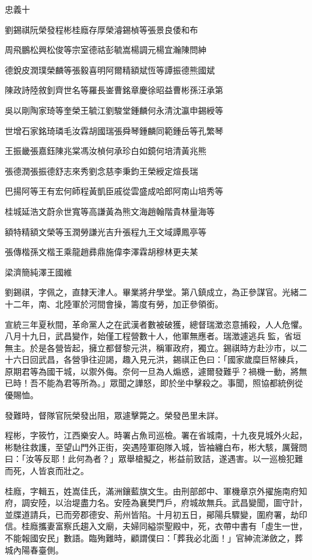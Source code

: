 
\begin{pinyinscope}
忠義十

劉錫祺阮榮發程彬桂廕存厚榮濬錫楨等張景良倭和布

周飛鵬松興松俊等宗室德祜彭毓嵩楊調元楊宜瀚陳問紳

德銳皮潤璞榮麟等張毅喜明阿爾精額斌恆等譚振德熊國斌

陳政詩陸敘釗齊世名等羅長崟曹銘章慶徐昭益曹彬孫汪承第

吳以剛陶家琦等奎榮王毓江劉駿堂鍾麟何永清沈瀛申錫綬等

世增石家銘琦璘毛汝霖胡國瑞張舜琴鍾麟同範鍾岳等孔繁琴

王振畿張嘉鈺陳兆棠馮汝楨何承珍白如鏡何培清黃兆熊

張德潤張振德舒志來秀劉念慈李秉鈞王榮綬定煊長瑞

巴揚阿等王有宏何師程黃凱臣戚從雲盛成哈郎阿南山培秀等

桂城延浩文蔚佘世寬等高謙黃為熊文海趙翰階貴林量海等

額特精額文榮等玉潤勞謙光吉升張程九王文域譚鳳亭等

張傳楷孫文楷王乘龍趙彞鼎施偉李澤霖胡穆林更夫某

梁濟簡純澤王國維

劉錫祺，字佩之，直隸天津人。畢業將弁學堂。第八鎮成立，為正參謀官。光緒二十二年，南、北陸軍於河間會操，籌度有勞，加正參領銜。

宣統三年夏秋間，革命黨人之在武漢者數被破獲，總督瑞澂恣意捕殺，人人危懼。八月十九日，武昌變作，始僅工程營數十人，他軍無應者。瑞澂遽逃兵監，省垣無主。於是各營皆起，擁立都督黎元洪，稱軍政府，獨立。錫祺時方赴沙市，以二十六日回武昌，各營爭往迎謁，趣入見元洪，錫祺正色曰：「國家歲糜巨帑練兵，原期君等為國干城，以禦外侮。奈何一旦為人煽惑，遽爾發難乎？禍機一動，將無已時！吾不能為君等所為。」眾聞之譁怒，即於坐中擊殺之。事聞，照協都統例從優賜恤。

發難時，督隊官阮榮發出阻，眾遽擊斃之。榮發邑里未詳。

程彬，字筱竹，江西樂安人。時署占魚司巡檢。署在省城南，十九夜見城外火起，彬馳往救護，至望山門外正街，突遇陸軍砲隊入城，皆袖纏白布，彬大駭，厲聲問曰：「汝等反耶！此何為者？」眾舉槍擬之，彬益前致詰，遂遇害。以一巡檢犯難而死，人皆哀而壯之。

桂廕，字輯五，姓嵩佳氏，滿洲鑲藍旗文生。由刑部郎中、軍機章京外擢施南府知府，調安陸，以治堤盡力名。安陸為襄樊門戶，府城故無兵。武昌變聞，圖守計，並牒道請兵，已而旁郡德安、荊州皆陷。十月初五日，鄖陽兵驟變，圍府署，劫印信。桂廕攜妻富察氏趨入文廟，夫婦同縊崇聖殿中，死，衣帶中書有「虛生一世，不能報國安民」數語。臨殉難時，顧謂僕曰：「葬我必北面！」官紳流涕斂之，葬城內陽春臺側。


\end{pinyinscope}
